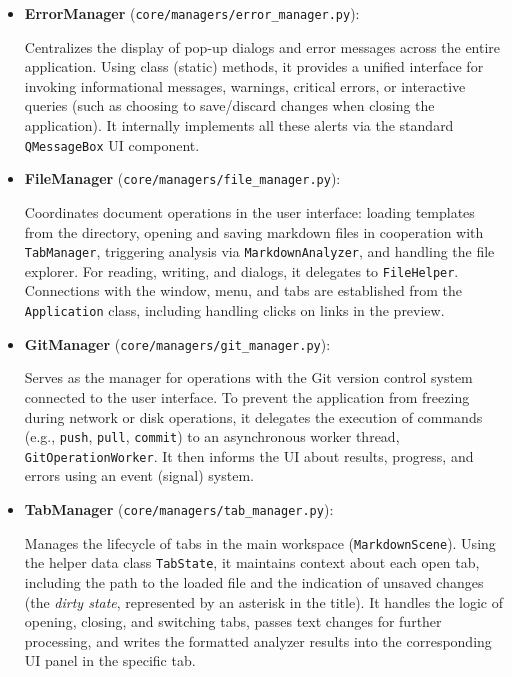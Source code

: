 \documentclass[12pt, a4paper]{article}
\begin{document}
\begin{itemize}
\begin{itemize}
        \item \textbf{ErrorManager} (\texttt{core/managers/error\_manager.py}):

        Centralizes the display of pop-up dialogs and error messages across the entire application. 
        Using class (static) methods, it provides a unified interface for invoking informational 
        messages, warnings, critical errors, or interactive queries (such as choosing to save/discard 
        changes when closing the application). It internally implements all these alerts via the standard 
        \texttt{QMessageBox} UI component.

        \item \textbf{FileManager} (\texttt{core/managers/file\_manager.py}):

        Coordinates document operations in the user interface: loading templates from the directory, 
        opening and saving markdown files in cooperation with \texttt{TabManager}, triggering analysis 
        via \texttt{MarkdownAnalyzer}, and handling the file explorer. For reading, writing, and dialogs, 
        it delegates to \texttt{FileHelper}. Connections with the window, menu, and tabs are established 
        from the \texttt{Application} class, including handling clicks on links in the preview.

        \item \textbf{GitManager} (\texttt{core/managers/git\_manager.py}):

        Serves as the manager for operations with the Git version control system connected to the user 
        interface. To prevent the application from freezing during network or disk operations, 
        it delegates the execution of commands (e.g., \texttt{push}, \texttt{pull}, \texttt{commit}) 
        to an asynchronous worker thread, \texttt{GitOperationWorker}. It then informs the UI about 
        results, progress, and errors using an event (signal) system.

        \item \textbf{TabManager} (\texttt{core/managers/tab\_manager.py}):

        Manages the lifecycle of tabs in the main workspace (\texttt{MarkdownScene}). Using the 
        helper data class \texttt{TabState}, it maintains context about each open tab, including 
        the path to the loaded file and the indication of unsaved changes (the \textit{dirty state}, 
        represented by an asterisk in the title). It handles the logic of opening, closing, and 
        switching tabs, passes text changes for further processing, and writes the formatted analyzer 
        results into the corresponding UI panel in the specific tab.
    \end{itemize}


\end{itemize}
\end{document}
